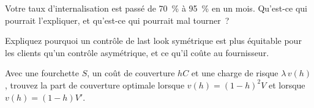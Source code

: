\begin{interviewq}\label{iq:hf:fx-market-making:4}
Votre taux d'internalisation est passé de 70~\% à 95~\% en un mois. Qu'est-ce qui pourrait l'expliquer, et qu'est-ce qui pourrait mal tourner~?
\end{interviewq}

\begin{interviewq}\label{iq:hf:fx-market-making:5}
Expliquez pourquoi un contrôle de last look symétrique est plus équitable pour les clients qu'un contrôle asymétrique, et ce qu'il coûte au fournisseur.
\end{interviewq}

\begin{interviewq}\label{iq:hf:fx-market-making:6}
Avec une fourchette $S$, un coût de couverture $hC$ et une charge de risque $\lambda\,v(h)$, trouvez la part de couverture optimale lorsque $v(h)=(1-h)^2V$ et lorsque
$v(h)=(1-h)V'$.
\end{interviewq}
